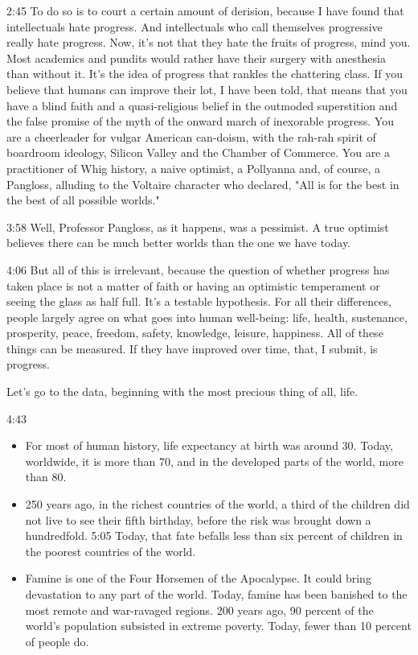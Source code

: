 \documentclass[10pt,titlepage]{article}
\begin{document}
2:45
To do so is to court a certain amount of derision,
because I have found that intellectuals hate progress.
And intellectuals who call themselves progressive really hate progress.
Now, it's not that they hate the fruits of progress, mind you.
Most academics and pundits
would rather have their surgery with anesthesia than without it.
It's the idea of progress that rankles the chattering class.
If you believe that humans can improve their lot, I have been told,
that means that you have a blind faith
and a quasi-religious belief in the outmoded superstition
and the false promise of the myth of the onward march
of inexorable progress.
You are a cheerleader for vulgar American can-doism,
with the rah-rah spirit of boardroom ideology,
Silicon Valley and the Chamber of Commerce.
You are a practitioner of Whig history,
a naive optimist, a Pollyanna and, of course, a Pangloss,
alluding to the Voltaire character who declared,
"All is for the best in the best of all possible worlds."

3:58
Well, Professor Pangloss, as it happens, was a pessimist.
A true optimist believes there can be much better worlds
than the one we have today.

4:06
But all of this is irrelevant,
because the question of whether progress has taken place
is not a matter of faith
or having an optimistic temperament or seeing the glass as half full.
It's a testable hypothesis.
For all their differences,
people largely agree on what goes into human well-being:
life, health, sustenance, prosperity, peace, freedom, safety, knowledge,
leisure, happiness.
All of these things can be measured.
If they have improved over time, that, I submit, is progress.

Let's go to the data,
beginning with the most precious thing of all, life.

4:43

\begin{itemize}
\item For most of human history, life expectancy at birth was around 30.
Today, worldwide, it is more than 70,
and in the developed parts of the world,
more than 80.
\item 250 years ago, in the richest countries of the world,
a third of the children did not live to see their fifth birthday,
before the risk was brought down a hundredfold.
5:05
Today, that fate befalls less than six percent of children
in the poorest countries of the world.
\item Famine is one of the Four Horsemen of the Apocalypse.
It could bring devastation to any part of the world.
Today, famine has been banished
to the most remote and war-ravaged regions.
200 years ago, 90 percent of the world's population
subsisted in extreme poverty.
Today, fewer than 10 percent of people do.
\end{itemize}
\end{document}
